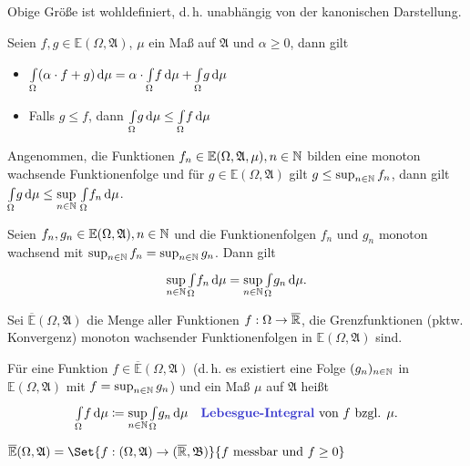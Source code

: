 \documentclass{cheat-sheet}
\newcommand{\Alg}{\mathfrak{A}} %
\newcommand{\Bor}{\mathfrak{B}} %
\newcommand{\E}{\mathbb{E}} %
\newcommand{\IntOmu}[1]{\Int{\Omega}{}{#1}{\mu}} %
\begin{document}
\begin{bem}
  Obige Größe ist wohldefiniert, d.\,h. unabhängig von der kanonischen Darstellung.
\end{bem}

\begin{satz}
  Seien $f, g \in \E(\Omega, \Alg)$, $\mu$ ein Maß auf $\Alg$ und $\alpha \geq 0$, dann gilt
  \begin{itemize}
    \item $\IntOmu{(\alpha \cdot f + g)} = \alpha \cdot \IntOmu{f} + \IntOmu{g}$ 
    \item Falls $g \leq f$, dann $\IntOmu{g} \leq \IntOmu{f}$ 
  \end{itemize}
\end{satz}

\begin{satz}
  Angenommen, die Funktionen $f_n \in \E(\Omega, \Alg, \mu), n \in \N$ bilden eine monoton wachsende Funktionenfolge und für $g \in \E(\Omega, \Alg)$ gilt $g \leq \sup_{n \in \mathbb{N}} f_n$, dann gilt $\textstyle \IntOmu{g} \leq \sup\limits_{n \in \N} \, \IntOmu{f_n}$.
\end{satz}

\begin{kor}
  Seien $f_n, g_n \in \E(\Omega, \Alg), n \in \N$ und die Funktionenfolgen $f_n$ und $g_n$ monoton wachsend mit $\sup_{n \in \mathbb{N}} f_n = \sup_{n \in \mathbb{N}} g_n$. Dann gilt
  \[ \sup_{n \in \N} \IntOmu{f_n} = \sup_{n \in \N} \IntOmu{g_n}. \]
\end{kor}

\begin{defn}
  Sei $\overline{\E}(\Omega, \Alg)$ die Menge aller Funktionen $f : \Omega \to \overline{\mathbb{R}}$, die Grenzfunktionen (pktw. Konvergenz) monoton wachsender Funktionenfolgen in $\E(\Omega, \Alg)$ sind.
\end{defn}

\begin{defn}
  Für eine Funktion $f \in \overline{\E}(\Omega, \Alg)$ (d.\,h. es existiert eine Folge $(g_n)_{n \in \mathbb{N}}$ in $\E(\Omega, \Alg)$ mit $f = \sup_{n \in \mathbb{N}} g_n$) und ein Maß $\mu$ auf $\Alg$ heißt
  \[ \IntOmu{f} \coloneqq \sup_{n \in \N} \IntOmu{g_n} \quad \text{\emph{Lebesgue-Integral} von $f$ bzgl. $\mu$.} \]
\end{defn}

\begin{satz}
  $\overline{\E}(\Omega, \Alg) = \Set{ f : (\Omega, \Alg) \to (\ER, \Bor) }{ f \text{ messbar und } f \geq 0 }$
\end{satz}
\end{document}
